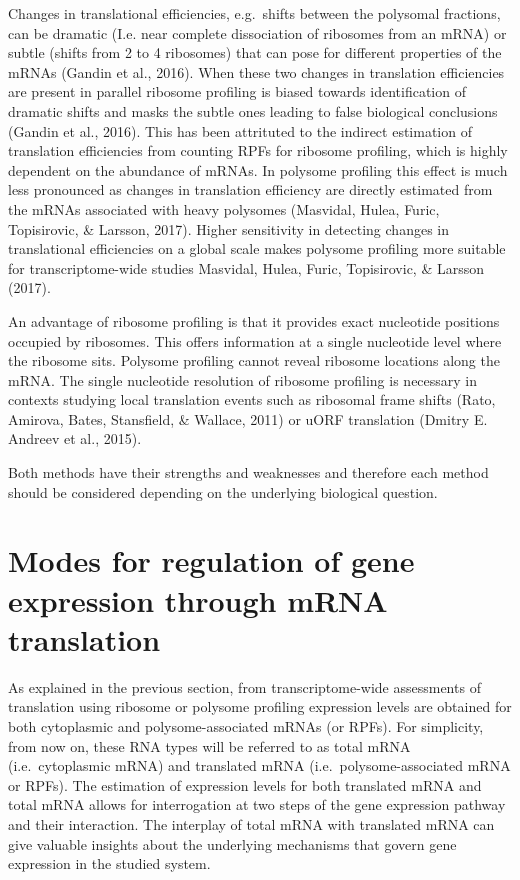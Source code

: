 \documentclass[
  12pt,
  openany]{book}
\begin{document}
Changes in translational efficiencies, e.g.~shifts between the polysomal fractions, can be dramatic (I.e. near complete dissociation of ribosomes from an mRNA) or subtle (shifts from 2 to 4 ribosomes) that can pose for different properties of the mRNAs (Gandin et al., 2016). When these two changes in translation efficiencies are present in parallel ribosome profiling is biased towards identification of dramatic shifts and masks the subtle ones leading to false biological conclusions (Gandin et al., 2016). This has been attrituted to the indirect estimation of translation efficiencies from counting RPFs for ribosome profiling, which is highly dependent on the abundance of mRNAs. In polysome profiling this effect is much less pronounced as changes in translation efficiency are directly estimated from the mRNAs associated with heavy polysomes (Masvidal, Hulea, Furic, Topisirovic, \& Larsson, 2017). Higher sensitivity in detecting changes in translational efficiencies on a global scale makes polysome profiling more suitable for transcriptome-wide studies Masvidal, Hulea, Furic, Topisirovic, \& Larsson (2017).

An advantage of ribosome profiling is that it provides exact nucleotide positions occupied by ribosomes. This offers information at a single nucleotide level where the ribosome sits. Polysome profiling cannot reveal ribosome locations along the mRNA. The single nucleotide resolution of ribosome profiling is necessary in contexts studying local translation events such as ribosomal frame shifts (Rato, Amirova, Bates, Stansfield, \& Wallace, 2011) or uORF translation (Dmitry E. Andreev et al., 2015).

Both methods have their strengths and weaknesses and therefore each method should be considered depending on the underlying biological question.
\newline

\section{Modes for regulation of gene expression through mRNA translation} \label{modes}

As explained in the previous section, from transcriptome-wide assessments of translation using ribosome or polysome profiling expression levels are obtained for both cytoplasmic and polysome-associated mRNAs (or RPFs). For simplicity, from now on, these RNA types will be referred to as total mRNA (i.e.~cytoplasmic mRNA) and translated mRNA (i.e.~polysome-associated mRNA or RPFs). The estimation of expression levels for both translated mRNA and total mRNA allows for interrogation at two steps of the gene expression pathway and their interaction. The interplay of total mRNA with translated mRNA can give valuable insights about the underlying mechanisms that govern gene expression in the studied system.
\end{document}
